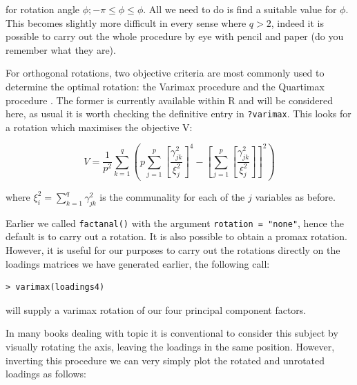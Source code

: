 for rotation angle $\phi; -\pi \leq \phi \leq \phi$.   All we need to do is find a suitable value for $\phi$.   This becomes slightly more difficult in every sense where $q>2$, indeed it is possible to carry out the whole procedure by eye with pencil and paper (do you remember what they are).


For orthogonal rotations, two objective criteria are most commonly used to determine the optimal rotation: the Varimax procedure \citep{Kaiser:1958} and the Quartimax procedure \cite{Neuhaus+Wrigley:1954}.   The former is currently available within R and will be considered here, as usual it is worth checking the definitive entry in \texttt{?varimax}.   This looks for a rotation which maximises the objective V:

\begin{equation}
V = \frac{1}{p^{2}} \sum_{k=1}^{q} \left( p \sum_{j=1}^{p} \left[\frac{\gamma_{jk}^{2}}{\xi_{j}^{2}} \right]^{4} - \left[ \sum_{j=1}^{p} \left[\frac{\gamma_{jk}^{2}}{\xi_{j}^{2}}\right] \right]^{2} \right)
\end{equation}

where $\xi_{i}^{2} = \sum_{k=1}^{q} \gamma_{jk}^{2}$ is the communality for each of the $j$ variables as before.


%


Earlier we called \texttt{factanal()} with the argument \texttt{rotation = "none"}, hence the default is to carry out a rotation.   It is also possible to obtain a promax rotation.   However, it is useful for our purposes to carry out the rotations directly on the loadings matrices we have generated earlier, the following call:
\begin{verbatim}
> varimax(loadings4)
\end{verbatim}
will supply a varimax rotation of our four principal component factors.

In many books dealing with topic it is conventional to consider this subject by visually rotating the axis, leaving the loadings in the same position.   However, inverting this procedure we can very simply plot the rotated and unrotated loadings as follows:

